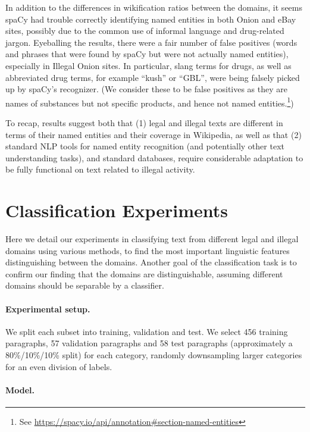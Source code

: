 \documentclass[11pt,a4paper,table]{article}
\begin{document}
In addition to the differences in wikification ratios between
the domains, it seems spaCy had trouble correctly identifying
named entities in both Onion and eBay sites, possibly
due to the common use of informal language and drug-related jargon.
Eyeballing the results, there were a fair number of false positives (words and phrases that were found by spaCy but were not actually named entities),
especially in Illegal Onion sites.
In particular, slang terms for drugs, as well as abbreviated drug terms, for example ``kush'' or ``GBL'',
were being falsely picked up by spaCy's recognizer.
(We consider these to be false positives as they are names of substances but not specific products, 
and hence not named entities.\footnote{See \url{https://spacy.io/api/annotation\#section-named-entities}})

To recap, results suggest both that (1) legal and illegal texts are different in terms of their named entities and their coverage in Wikipedia, as well as that (2) standard NLP tools for named entity recognition (and potentially other text understanding tasks), and standard databases, require considerable adaptation to be fully functional on text related to illegal activity.


\section{Classification Experiments} \label{sec:classification}

Here we detail our experiments in classifying text from different legal and
illegal domains using various methods, to find the most important linguistic features
distinguishing between the domains. Another goal of the classification task is to confirm our finding that the domains are distinguishable, assuming different domains should be separable by a classifier.

\paragraph{Experimental setup.}

We split each subset into training, validation and test.
We select 456 training paragraphs, 57 validation paragraphs and
58 test paragraphs (approximately a 80\%/10\%/10\% split) for each category,
randomly downsampling larger categories for an even division of labels.

\paragraph{Model.}
\end{document}
